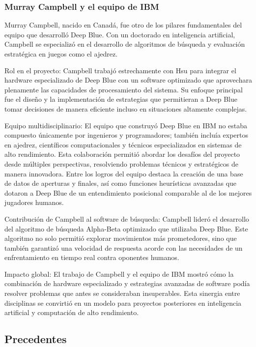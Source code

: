 \documentclass[12pt,a4paper]{article}
\begin{document}
\subsubsection*{Murray Campbell y el equipo de IBM}
Murray Campbell, nacido en Canadá, fue otro de los pilares fundamentales del equipo que desarrolló Deep Blue. Con un doctorado en inteligencia artificial, Campbell se especializó en el desarrollo de algoritmos de búsqueda y evaluación estratégica en juegos como el ajedrez.

Rol en el proyecto:
Campbell trabajó estrechamente con Hsu para integrar el hardware especializado de Deep Blue con un software optimizado que aprovechara plenamente las capacidades de procesamiento del sistema. Su enfoque principal fue el diseño y la implementación de estrategias que permitieran a Deep Blue tomar decisiones de manera eficiente incluso en situaciones altamente complejas.

Equipo multidisciplinario:
El equipo que construyó Deep Blue en IBM no estaba compuesto únicamente por ingenieros y programadores; también incluía expertos en ajedrez, científicos computacionales y técnicos especializados en sistemas de alto rendimiento. Esta colaboración permitió abordar los desafíos del proyecto desde múltiples perspectivas, resolviendo problemas técnicos y estratégicos de manera innovadora.
Entre los logros del equipo destaca la creación de una base de datos de aperturas y finales, así como funciones heurísticas avanzadas que dotaron a Deep Blue de un entendimiento posicional comparable al de los mejores jugadores humanos.

Contribución de Campbell al software de búsqueda:
Campbell lideró el desarrollo del algoritmo de búsqueda Alpha-Beta optimizado que utilizaba Deep Blue. Este algoritmo no solo permitió explorar movimientos más prometedores, sino que también garantizó una velocidad de respuesta acorde con las necesidades de un enfrentamiento en tiempo real contra oponentes humanos.

Impacto global:
El trabajo de Campbell y el equipo de IBM mostró cómo la combinación de hardware especializado y estrategias avanzadas de software podía resolver problemas que antes se consideraban insuperables. Esta sinergia entre disciplinas se convirtió en un modelo para proyectos posteriores en inteligencia artificial y computación de alto rendimiento.

\subsection{Precedentes}
\end{document}
